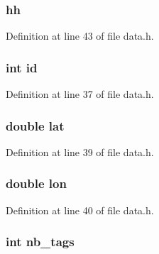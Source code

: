 \subsubsection[{\texorpdfstring{hh}{hh}}]{ hh}\hypertarget{struct_node_a67d3d81a4f9a9622b0befade8d131661}{}\label{struct_node_a67d3d81a4f9a9622b0befade8d131661}


Definition at line 43 of file data.\+h.

\subsubsection[{\texorpdfstring{id}{id}}]{\setlength{\rightskip}{0pt plus 5cm}int id}\hypertarget{struct_node_a7441ef0865bcb3db9b8064dd7375c1ea}{}\label{struct_node_a7441ef0865bcb3db9b8064dd7375c1ea}


Definition at line 37 of file data.\+h.

\subsubsection[{\texorpdfstring{lat}{lat}}]{\setlength{\rightskip}{0pt plus 5cm}double lat}\hypertarget{struct_node_a7972334534f68166121a6e51b0aac2d6}{}\label{struct_node_a7972334534f68166121a6e51b0aac2d6}


Definition at line 39 of file data.\+h.

\subsubsection[{\texorpdfstring{lon}{lon}}]{\setlength{\rightskip}{0pt plus 5cm}double lon}\hypertarget{struct_node_aa96391e04b5977c50b96d77bea86a01d}{}\label{struct_node_aa96391e04b5977c50b96d77bea86a01d}


Definition at line 40 of file data.\+h.

\subsubsection[{\texorpdfstring{nb\+\_\+tags}{nb_tags}}]{\setlength{\rightskip}{0pt plus 5cm}int nb\+\_\+tags}\hypertarget{struct_node_a5090182abe45c6d1577adb6c195378f3}{}\label{struct_node_a5090182abe45c6d1577adb6c195378f3}


